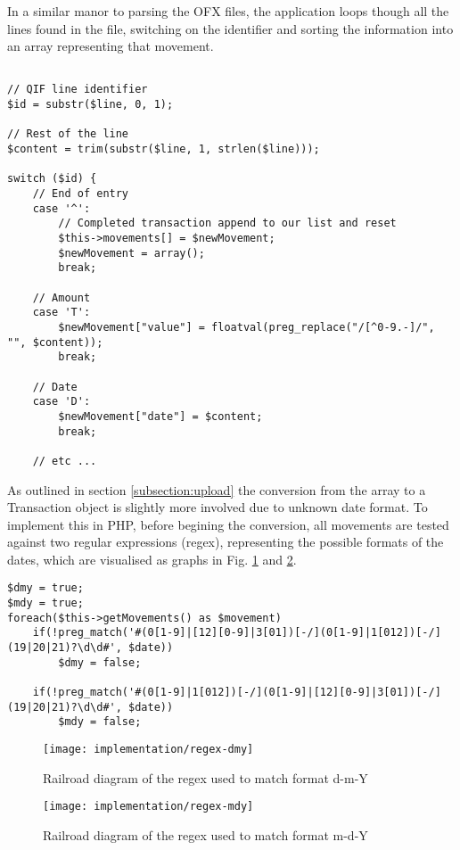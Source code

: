 In a similar manor to parsing the OFX files, the application loops though all the lines found in the file, switching on the identifier and sorting the information into an array representing that movement. 

\lstset{style=phpcolor}
\begin{lstlisting}[float,floatplacement=H]

// QIF line identifier
$id = substr($line, 0, 1);

// Rest of the line
$content = trim(substr($line, 1, strlen($line)));

switch ($id) {
	// End of entry
	case '^':
		// Completed transaction append to our list and reset
		$this->movements[] = $newMovement;
		$newMovement = array();
		break;
		
	// Amount
	case 'T':
		$newMovement["value"] = floatval(preg_replace("/[^0-9.-]/", "", $content));
		break;
		
	// Date
	case 'D':
		$newMovement["date"] = $content;
		break;
		
	// etc ...
\end{lstlisting}

As outlined in section \ref{subsection:upload} the conversion from the array to a Transaction object is slightly more involved due to unknown date format. To implement this in PHP, before begining the conversion, all movements are tested against two regular expressions (regex), representing the possible formats of the dates, which are visualised as graphs in Fig. \ref{fig:regex-dmy} and \ref{fig:regex-mdy}. 

\lstset{style=phpcolor}
\begin{lstlisting}[float,floatplacement=H]
$dmy = true;
$mdy = true;
foreach($this->getMovements() as $movement)
	if(!preg_match('#(0[1-9]|[12][0-9]|3[01])[-/](0[1-9]|1[012])[-/](19|20|21)?\d\d#', $date))
		$dmy = false;
	
	if(!preg_match('#(0[1-9]|1[012])[-/](0[1-9]|[12][0-9]|3[01])[-/](19|20|21)?\d\d#', $date))
		$mdy = false;
\end{lstlisting}

\begin{figure}[h]
    \centering
    \texttt{[image: implementation/regex-dmy]}
    \caption[Regular expression used to match d-m-Y]{Railroad diagram of the regex used to match format d-m-Y}
    \label{fig:regex-dmy}
\end{figure}

\begin{figure}[h]
    \centering
    \texttt{[image: implementation/regex-mdy]}
    \caption[Regular expression used to match m-d-Y]{Railroad diagram of the regex used to match format m-d-Y}
    \label{fig:regex-mdy}
\end{figure}

